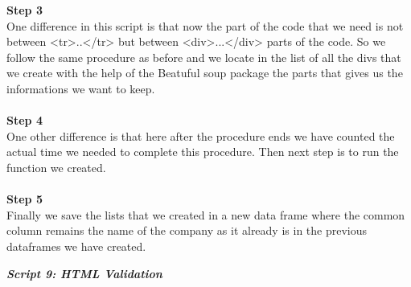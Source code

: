 \documentclass{article}
\begin{document}
\textbf{Step 3}\\
One difference in this script is that now the part of the code that we need is not between <tr>..</tr> but between <div>...</div> parts of the code. So we follow the same procedure as before and we locate in the list of all the divs that we create with the help of the Beatuful soup package the parts that gives us the informations we want to keep.\\\\
\textbf{Step 4}\\
One other difference is that here after the procedure ends we have counted the actual time we needed to complete this procedure. Then next step is to run the function we created.\\\\
\textbf{Step 5}\\
Finally we save the lists that we created in a new data frame where the common column remains the name of the company as it already is in the previous dataframes we have created.
\begin{center}
\textit{\textbf{Script 9: HTML Validation}}
\end{center}
\end{document}
